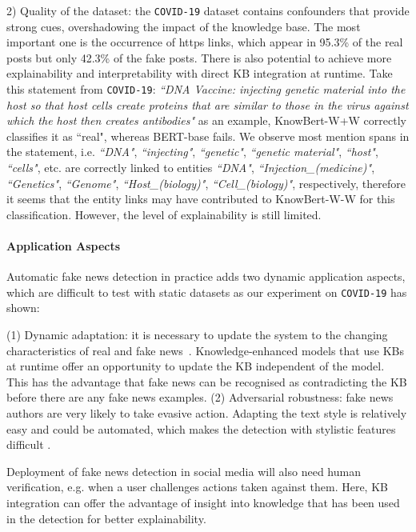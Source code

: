 \documentclass[letterpaper]{article} %
\begin{document}
2) Quality of the dataset:
the \texttt{COVID-19} dataset contains confounders that provide strong cues, overshadowing the impact of the knowledge base.
The most important one is the occurrence of https links, which appear in 95.3\% of the real posts but only 42.3\% of the fake posts.  There is also potential to achieve more explainability and interpretability with direct KB integration at runtime.
Take this statement from \texttt{COVID-19}: \textit{``DNA Vaccine: injecting genetic material into the host so that host cells create proteins that are similar to those in the virus against which the host then creates antibodies"} as an example,
KnowBert-W+W correctly classifies it as ``real", whereas BERT-base fails.
We observe most mention spans in the statement, i.e.  \textit{``DNA"}, \textit{``injecting"}, \textit{``genetic"}, \textit{``genetic material"}, \textit{``host"}, \textit{``cells"}, etc. are correctly linked to entities \textit{``DNA"}, \textit{``Injection\_(medicine)"}, \textit{``Genetics"}, \textit{``Genome"}, \textit{``Host\_(biology)"}, \textit{``Cell\_(biology)"}, respectively,
therefore it seems that the entity links may have contributed to KnowBert-W-W for this classification.
However, the level of explainability is still limited.


\paragraph{Application Aspects}
Automatic fake news detection in practice adds two dynamic application aspects, which are difficult to test with static datasets as our experiment on \texttt{COVID-19} has shown:

(1) Dynamic adaptation: it is necessary to update the system to the changing characteristics of real and fake news~\cite{silva2021concept}.
Knowledge-enhanced models that use KBs at runtime offer an opportunity to update the KB independent of the model. %
This has the advantage that fake news can be recognised as contradicting the KB before there are any fake news examples.  (2) Adversarial robustness: fake news authors are very likely to take evasive action.
Adapting the text style is relatively easy and could be automated, which makes the detection with stylistic features difficult \citep[see][]{NEURIPS2019_3e9f0fc9, schuster-etal-2020-limitations}.

Deployment of fake news detection in social media will also need human verification, e.g. when a user challenges actions taken against them.
Here, KB integration can offer the advantage of insight into knowledge that has been used in the detection for better explainability.
\end{document}
